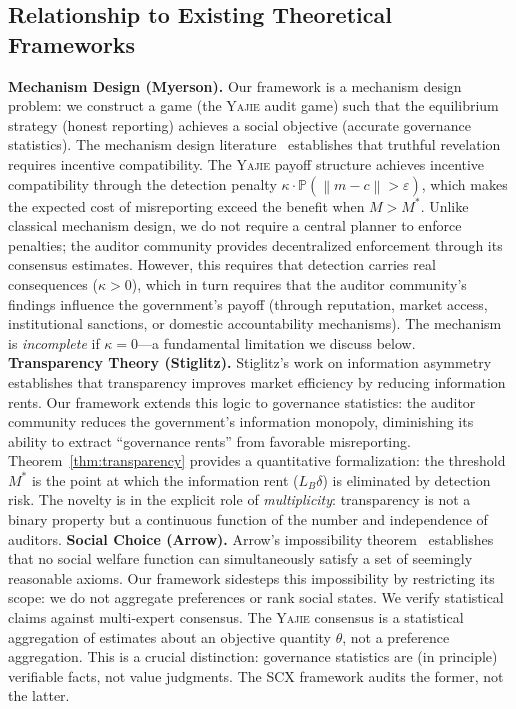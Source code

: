\documentclass[11pt,a4paper]{article}
\theoremstyle{definition}
\newcommand{\Yajie}{\textsc{Yajie}}
\newcommand{\SCX}{\textsc{SCX}}
\newcommand{\Pbb}{\mathbb{P}}
\newcommand{\norm}[1]{\left\lVert#1\right\rVert}
\begin{document}
\subsection{Relationship to Existing Theoretical Frameworks}
\textbf{Mechanism Design (Myerson).} Our framework is a mechanism design problem: we construct a game (the \Yajie{} audit game) such that the equilibrium strategy (honest reporting) achieves a social objective (accurate governance statistics). The mechanism design literature~\cite{Myerson1981,Myerson2008} establishes that truthful revelation requires incentive compatibility. The \Yajie{} payoff structure achieves incentive compatibility through the detection penalty $\kappa \cdot \Pbb(\norm{m - c} > \varepsilon)$, which makes the expected cost of misreporting exceed the benefit when $M > M^*$. Unlike classical mechanism design, we do not require a central planner to enforce penalties; the auditor community provides decentralized enforcement through its consensus estimates. However, this requires that detection carries real consequences ($\kappa > 0$), which in turn requires that the auditor community's findings influence the government's payoff (through reputation, market access, institutional sanctions, or domestic accountability mechanisms). The mechanism is \textit{incomplete} if $\kappa = 0$---a fundamental limitation we discuss below.
\textbf{Transparency Theory (Stiglitz).} Stiglitz's work on information asymmetry~\cite{Stiglitz2002,Stiglitz2000} establishes that transparency improves market efficiency by reducing information rents. Our framework extends this logic to governance statistics: the auditor community reduces the government's information monopoly, diminishing its ability to extract ``governance rents'' from favorable misreporting. Theorem~\ref{thm:transparency} provides a quantitative formalization: the threshold $M^*$ is the point at which the information rent ($L_B \delta$) is eliminated by detection risk. The novelty is in the explicit role of \textit{multiplicity}: transparency is not a binary property but a continuous function of the number and independence of auditors.
\textbf{Social Choice (Arrow).} Arrow's impossibility theorem~\cite{Arrow1951} establishes that no social welfare function can simultaneously satisfy a set of seemingly reasonable axioms. Our framework sidesteps this impossibility by restricting its scope: we do not aggregate preferences or rank social states. We verify statistical claims against multi-expert consensus. The \Yajie{} consensus is a statistical aggregation of estimates about an objective quantity $\theta$, not a preference aggregation. This is a crucial distinction: governance statistics are (in principle) verifiable facts, not value judgments. The \SCX{} framework audits the former, not the latter.
\end{document}
